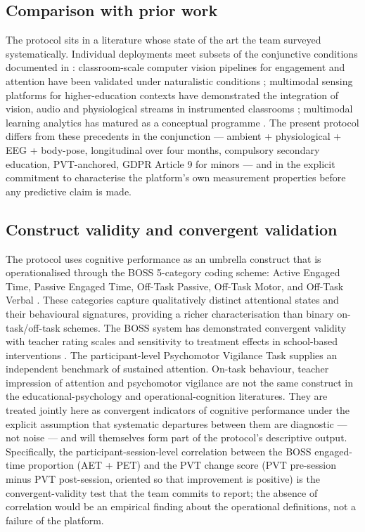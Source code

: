 \subsection{Comparison with prior work}\label{subsec:comparison}

The protocol sits in a literature whose state of the art the team surveyed systematically. Individual deployments meet subsets of the conjunctive conditions documented in : classroom-scale computer vision pipelines for engagement and attention have been validated under naturalistic conditions \parencite{Hutt2019_mind_wandering,Parambil2022_smart_classroom}; multimodal sensing platforms for higher-education contexts have demonstrated the integration of vision, audio and physiological streams in instrumented classrooms \parencite{Ahuja2019_edusense}; multimodal learning analytics has matured as a conceptual programme \parencite{Blikstein2016_multimodal,Schneider2015_unraveling}. The present protocol differs from these precedents in the conjunction --- ambient + physiological + EEG + body-pose, longitudinal over four months, compulsory secondary education, PVT-anchored, GDPR Article 9 for minors --- and in the explicit commitment to characterise the platform's own measurement properties before any predictive claim is made.

\subsection{Construct validity and convergent validation}\label{subsec:construct-validity}

The protocol uses cognitive performance as an umbrella construct that is operationalised through the BOSS 5-category coding scheme: Active Engaged Time, Passive Engaged Time, Off-Task Passive, Off-Task Motor, and Off-Task Verbal \parencite{Shapiro2011_boss}. These categories capture qualitatively distinct attentional states and their behavioural signatures, providing a richer characterisation than binary on-task/off-task schemes. The BOSS system has demonstrated convergent validity with teacher rating scales and sensitivity to treatment effects in school-based interventions \parencite{Alperin2023_boss_validation,Volpe2023_classroom_observation_review}. The participant-level Psychomotor Vigilance Task supplies an independent benchmark of sustained attention. On-task behaviour, teacher impression of attention and psychomotor vigilance are not the same construct in the educational-psychology and operational-cognition literatures. They are treated jointly here as convergent indicators of cognitive performance under the explicit assumption that systematic departures between them are diagnostic --- not noise --- and will themselves form part of the protocol's descriptive output. Specifically, the participant-session-level correlation between the BOSS engaged-time proportion (AET + PET) and the PVT change score (PVT pre-session minus PVT post-session, oriented so that improvement is positive) is the convergent-validity test that the team commits to report; the absence of correlation would be an empirical finding about the operational definitions, not a failure of the platform.

